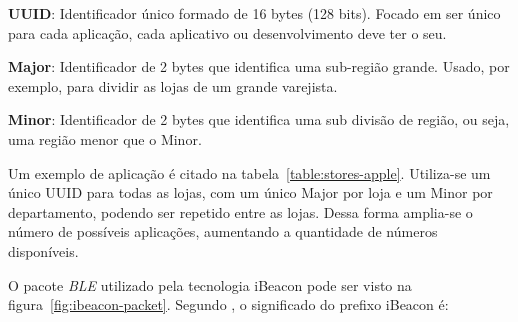 \documentclass[
		12pt,				%
		openright,			%
		oneside,			%
		a4paper,			%
		chapter=TITLE,		%
		english,			%
		brazil				%
	]{abntex2}
\begin{document}
\begin{alineas}
	\item \textbf{UUID}: Identificador único formado de 16 bytes (128 bits). Focado em ser único para cada aplicação, cada aplicativo ou desenvolvimento deve ter o seu.
	\item \textbf{Major}: Identificador de 2 bytes que identifica uma sub-região grande. Usado, por exemplo, para dividir as lojas de um grande varejista.
	\item \textbf{Minor}: Identificador de 2 bytes que identifica uma sub divisão de região, ou seja, uma região menor que o Minor.
\end{alineas}

Um exemplo de aplicação é citado na tabela~\ref{table:stores-apple}. Utiliza-se um único UUID para todas as lojas, com um único Major por loja e um Minor por departamento, podendo ser repetido entre as lojas. Dessa forma amplia-se o número de possíveis aplicações, aumentando a quantidade de números disponíveis.

\begin{table}[htb]
\end{table}

O pacote \textit{BLE} utilizado pela tecnologia iBeacon pode ser visto na figura~\ref{fig:ibeacon-packet}. Segundo , o significado do prefixo iBeacon é:
\end{document}
